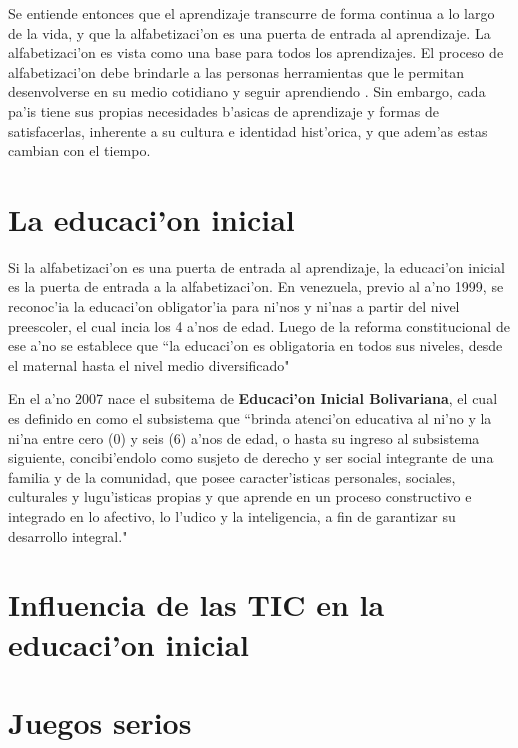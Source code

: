 Se entiende entonces que el aprendizaje transcurre de forma continua a lo largo de la vida, y que la alfabetizaci'on es una puerta de entrada al aprendizaje. La alfabetizaci'on es vista como una base para todos los aprendizajes. El proceso de alfabetizaci'on debe brindarle a las personas herramientas que le permitan desenvolverse en su medio cotidiano y seguir aprendiendo \cite{infante13}. Sin embargo, cada pa'is tiene sus propias necesidades b'asicas de aprendizaje y formas de satisfacerlas, inherente a su cultura e identidad hist'orica, y que adem'as estas cambian con el tiempo.


\section{La educaci'on inicial}


Si la alfabetizaci'on es una puerta de entrada al aprendizaje, la educaci'on inicial es la puerta de entrada a la alfabetizaci'on. En venezuela, previo al a'no 1999, se reconoc'ia la educaci'on obligator'ia para ni'nos y ni'nas a partir del nivel preescoler, el cual incia los 4 a'nos de edad. Luego de la reforma constitucional de ese a'no se establece que ``la educaci'on es obligatoria en todos sus niveles, desde el maternal hasta el nivel medio diversificado" \cite{UnescoAEPI}

En el a'no 2007 nace el subsitema de \textbf{Educaci'on Inicial Bolivariana}, el cual es definido en \cite{CurriculoSEPB} como el subsistema que ``brinda atenci'on educativa al ni'no y la ni'na entre cero (0) y seis (6) a'nos de edad, o hasta su ingreso al subsistema siguiente, concibi'endolo como susjeto de derecho y ser social integrante de una familia y de la comunidad, que posee caracter'isticas personales, sociales, culturales y lugu'isticas propias y que aprende en un proceso constructivo e integrado en lo afectivo, lo l'udico y la inteligencia, a fin de garantizar su desarrollo integral."

\section{Influencia de las TIC en la educaci'on inicial}


\section{Juegos serios}




